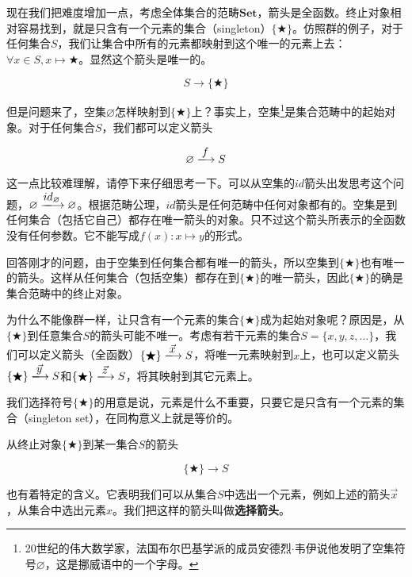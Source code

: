 \documentclass{article}
\begin{document}
\begin{example}
现在我们把难度增加一点，考虑全体集合的范畴$\pmb{Set}$，箭头是全函数。终止对象相对容易找到，就是只含有一个元素的集合（singleton）$\{ \bigstar \}$。仿照群的例子，对于任何集合$S$，我们让集合中所有的元素都映射到这个唯一的元素上去：$\forall x \in S, x \mapsto \bigstar$。显然这个箭头是唯一的。

\[
  S \longrightarrow \{ \bigstar \}
\]

但是问题来了，空集$\varnothing$怎样映射到$\{ \bigstar \}$上？事实上，空集\footnote{20世纪的伟大数学家，法国布尔巴基学派的成员安德烈$\cdot$韦伊说他发明了空集符号$\varnothing$，这是挪威语中的一个字母。}是集合范畴中的起始对象。对于任何集合$S$，我们都可以定义箭头

\[
  \varnothing \arrowto{f} S
\]

这一点比较难理解，请停下来仔细思考一下。可以从空集的$id$箭头出发思考这个问题，$\varnothing \arrowto{id_{\varnothing}} \varnothing$。根据范畴公理，$id$箭头是任何范畴中任何对象都有的。空集是到任何集合（包括它自己）都存在唯一箭头的对象。只不过这个箭头所表示的全函数没有任何参数。它不能写成$f(x): x \mapsto y$的形式。

回答刚才的问题，由于空集到任何集合都有唯一的箭头，所以空集到$\{ \bigstar \}$也有唯一的箭头。这样从任何集合（包括空集）都存在到$\{ \bigstar \}$的唯一箭头，因此$\{ \bigstar \}$的确是集合范畴中的终止对象。

为什么不能像群一样，让只含有一个元素的集合$\{ \bigstar \}$成为起始对象呢？原因是，从$\{ \bigstar \}$到任意集合$S$的箭头可能不唯一。考虑有若干元素的集合$S = \{x, y, z, ...\}$，我们可以定义箭头（全函数）$\{ \bigstar \} \arrowto{\vec{x}} S$，将唯一元素映射到$x$上，也可以定义箭头$\{ \bigstar \} \arrowto{\vec{y}} S$和$\{ \bigstar \} \arrowto{\vec{z}} S$，将其映射到其它元素上。

我们选择符号$\{ \bigstar \}$的用意是说，元素是什么不重要，只要它是只含有一个元素的集合（singleton set），在同构意义上就是等价的。

\label{sec:selection-arrow} 
从终止对象$\{ \bigstar \}$到某一集合$S$的箭头

\[
  \{ \bigstar \} \longrightarrow S
\]

也有着特定的含义。它表明我们可以从集合$S$中选出一个元素，例如上述的箭头$\vec{x}$，从集合中选出元素$x$。我们把这样的箭头叫做\textbf{选择箭头}。
\end{example}
\end{document}
